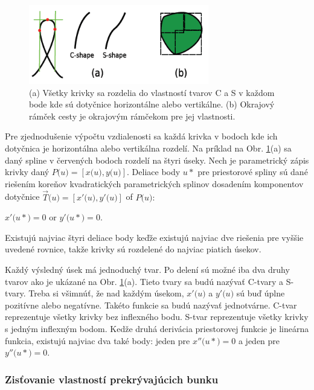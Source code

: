 \begin{figure}[H]
\begin{center}
\includegraphics[width=0.7\textwidth]{images/splitting_curves_1}
\caption{(a) Všetky krivky sa rozdelia do vlastností tvarov C a S v každom bode kde sú dotyčnice horizontálne alebo vertikálne. (b) Okrajový rámček cesty je okrajovým rámčekom pre jej vlastnosti. \cite{qmk08}}
\label{img:splitting_curves_1}
\end{center}
\end{figure}
Pre zjednodušenie výpočtu vzdialenosti sa každá krivka v bodoch kde ich dotyčnica je horizontálna alebo vertikálna rozdelí. Na príklad na Obr. \ref{img:splitting_curves_1}(a) sa daný spline v červených bodoch rozdelí na štyri úseky. Nech je parametrický zápis krivky daný \( P\big(u\big) = [x\big(u\big),y\big(u\big)]\). Deliace body \(u*\) pre priestorové spliny sú dané riešením koreňov kvadratických parametrických splinov dosadením komponentov dotyčnice \(\overrightarrow{T}\big(u\big) = [x'\big(u\big),y'\big(u\big)]\) of \(P\big(u\big):\)
\begin{center}
\(x'\big(u*\big) = 0\) or \(y'\big(u*\big) = 0\).
\end{center}
Existujú najviac štyri deliace body keďže existujú najviac dve riešenia pre vyššie uvedené rovnice, takže krivky sú rozdelené do najviac piatich úsekov.

Každý výsledný úsek má jednoduchý tvar. Po delení sú možné iba dva druhy tvarov ako je ukázané na Obr. \ref{img:splitting_curves_1}(a). Tieto tvary sa budú nazývať C-tvary a S-tvary. Treba si všimnúť, že nad každým úsekom, \(x'\big(u\big)\) a \(y'\big(u\big)\) sú buď úplne pozitívne alebo negatívne. Takéto funkcie sa budú nazývať jednotvárne. C-tvar reprezentuje všetky krivky bez inflexného bodu. S-tvar reprezentuje všetky krivky s jedným inflexným bodom. Kedže druhá derivácia priestorovej funkcie je lineárna funkcia, existujú najviac dva také body: jeden pre \(x''\big(u*\big) = 0\) a jeden pre \(y''\big(u*\big) = 0\).

\subsubsection{Zisťovanie vlastností prekrývajúcich bunku}

